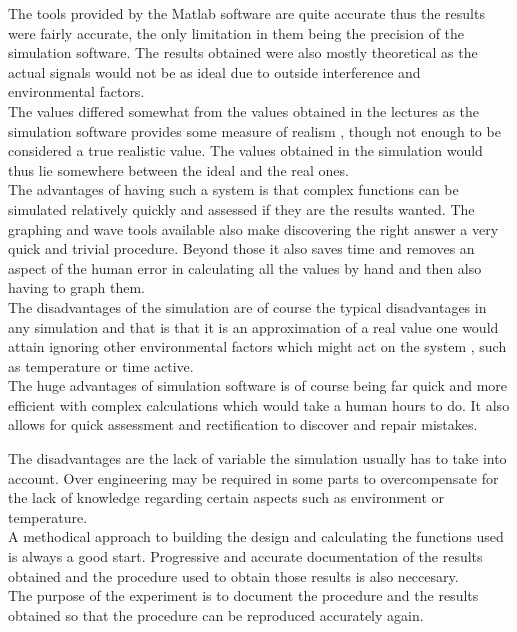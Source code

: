 \documentclass{article}
\begin{document}
The tools provided by the Matlab software are quite accurate thus the results were fairly accurate, the only limitation in them being the precision of the simulation software. The results obtained were also mostly theoretical as the actual signals would not be as ideal due to outside interference and environmental factors.\\

The values differed somewhat from the values obtained in the lectures as the simulation software provides some measure of realism , though not enough to be considered a true realistic value. The values obtained in the simulation would thus lie somewhere between the ideal and the real ones.
	\\
The advantages of having such a system is that complex functions can be simulated relatively quickly and assessed if they are the results wanted. The graphing and wave tools available also make discovering the right answer a very quick and trivial procedure.
Beyond those it also saves time and removes an aspect of the human error in calculating all the values by hand and then also having to graph them.
\\
The disadvantages of the simulation are of course the typical disadvantages in any simulation and that is that it is an approximation of a real value one would attain ignoring other environmental factors which might act on the system , such as temperature or time active.
\\
The huge advantages of simulation software is of course being far quick and more efficient with complex calculations which would take a human hours to do. 
It also allows for quick assessment and rectification to discover and repair mistakes.

	The disadvantages are the lack of variable the simulation usually has to take into account. Over engineering may be required in some parts to overcompensate for the lack of knowledge regarding certain aspects such as environment or temperature.\\


A methodical approach to building the design and calculating the functions used is always a good start. Progressive and accurate documentation of the results obtained and the procedure used to obtain those results is also neccesary. \\
The purpose of the experiment is to document the procedure and the results obtained so that the procedure can be reproduced accurately again.
\\
\end{document}

